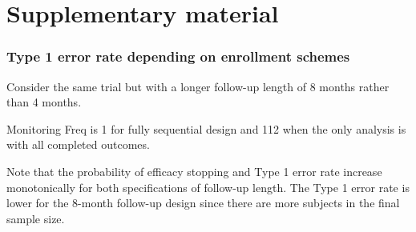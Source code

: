 \documentclass[12pt]{article}
\begin{document}
\section{Supplementary material}


\subsubsection{Type 1 error rate depending on enrollment schemes}
Consider the same trial but with a longer follow-up length of 8 months rather than 4 months. 

Monitoring Freq is 1 for fully sequential design and 112 when the only analysis is with all completed outcomes.

Note that the probability of efficacy stopping and Type 1 error rate increase monotonically for both specifications of follow-up length. The Type 1 error rate is lower for the 8-month follow-up design since there are more subjects in the final sample size.


\newpage
\end{document}
